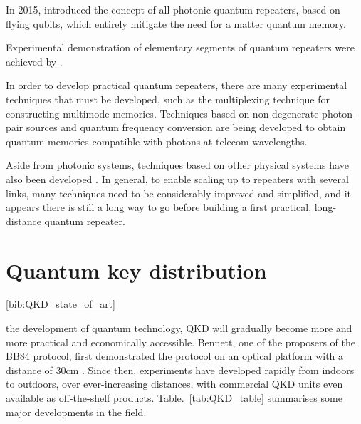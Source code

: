 In 2015, \cite{bib:ncomms7787} introduced the concept of all-photonic quantum repeaters, based on flying qubits, which entirely mitigate the need for a matter quantum memory. 

Experimental demonstration of elementary segments of quantum repeaters were achieved by \cite{bib:Sc_316_1316, bib:Nature_454_1098}.

In order to develop practical quantum repeaters, there are many experimental techniques that must be developed, such as the multiplexing technique \cite{bib:PRA_76_050301, bib:PRA_82_010304, bib:PRL_113_053603, bib:PRL_98_060502} for constructing multimode memories. Techniques based on non-degenerate photon-pair sources \cite{bib:Nat_469_508, bib:Nat_469_512, bib:PRL_112_040504, bib:PRA_92_012329} and quantum frequency conversion \cite{bib:NP_6_894, bib:NC_5_3376} are being developed to obtain quantum memories compatible with photons at telecom wavelengths.

Aside from photonic systems, techniques based on other physical systems have also been developed \cite{bib:NP_11_37, bib:Sc_337_72, bib:N_484_195, bib:bernien2013heralded}. In general, to enable scaling up to repeaters with several links, many techniques need to be considerably improved and simplified, and it appears there is still a long way to go before building a first practical, long-distance quantum repeater.

%
%

\section{Quantum key distribution} \ref{bib:QKD_state_of_art}

 the development of quantum technology, QKD will gradually become more and more practical and economically accessible. Bennett, one of the proposers of the BB84 protocol, first demonstrated the protocol on an optical platform with a distance of 30cm \cite{bib:JC_5_3}. Since then, experiments have developed rapidly from indoors to outdoors, over ever-increasing distances, with commercial QKD units even available as off-the-shelf products. Table.~\ref{tab:QKD_table} summarises some major developments in the field.

